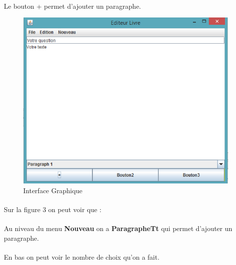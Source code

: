 \documentclass[12pt,a4paper]{article}
\begin{document}
  \paragraph{}Le bouton + permet d'ajouter un paragraphe.
 \begin{figure}[ht]
  \begin{center}
    \includegraphics[width=1.1\textwidth]{./images/edit1.png} 
  \end{center}
  \caption{Interface Graphique}
  \label{fig:mon_image}
\end{figure}
\newpage
\paragraph{}Sur la figure 3 on peut voir que : 
\paragraph{} Au niveau du menu \textbf{Nouveau} on a \textbf{ParagrapheTt} qui permet d'ajouter un paragraphe.
\paragraph{}En bas on peut voir le nombre de choix qu'on a fait.
\end{document}
